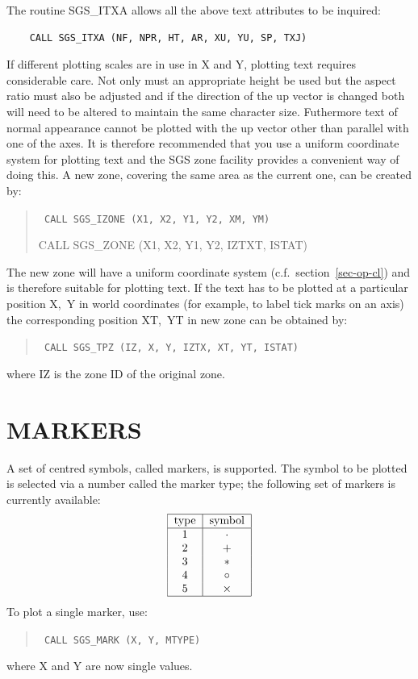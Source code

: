 \documentclass[11pt]{article}
\newcommand{\hyperref}[4]{#2\ref{#4}#3}
\newcommand{\htmlref}[2]{#1}
\begin{document}
The routine 
\htmlref{SGS\_ITXA}{SGS_ITXA}
allows all the above text attributes to be inquired:
\begin{verbatim}
    CALL SGS_ITXA (NF, NPR, HT, AR, XU, YU, SP, TXJ)
\end{verbatim}
If different plotting scales are in use in X and Y, plotting text requires
considerable care.  Not only must an appropriate height be used but the aspect
ratio must also be adjusted and if the direction of the up vector is changed
both will need to be altered to maintain the same character size.  Futhermore
text of normal appearance cannot be plotted with the up vector other than 
parallel with one of the axes.
It is therefore recommended that you use a uniform coordinate system for
plotting text and the SGS zone facility provides a convenient way of doing 
this.  A new zone, covering the same area as the current 
one, can be created by:
\begin{quote}{\tt
    CALL \htmlref{SGS\_IZONE}{SGS_IZONE} (X1, X2, Y1, Y2, XM, YM)

    CALL \htmlref{SGS\_ZONE}{SGS_ZONE} (X1, X2, Y1, Y2, IZTXT, ISTAT)}
\end{quote}
The new zone will have a uniform coordinate system (c.f.\ 
\hyperref{this section}{section~}{}{sec-op-cl}) and is 
therefore suitable for plotting text.  If the text has to be plotted at a
particular position X,~Y in world coordinates (for example, to label tick
marks on an axis) the corresponding position XT,~YT in new zone can be obtained
by:
\begin{quote}{\tt
    CALL \htmlref{SGS\_TPZ}{SGS_TPZ} (IZ, X, Y, IZTX, XT, YT, ISTAT)}
\end{quote}
where IZ is the zone ID of the original zone.

\section {MARKERS}\label{sec-markers}

A set of centred symbols, called markers, is supported.  The
symbol to be plotted is selected via a number called the marker
type;  the following set of markers is currently available:
\[\tt\begin{tabular}{|c|c|}\hline
type&symbol\\\hline
1&$\cdot$\\
2&$+$\\
3&$\ast$\\
4&$\circ$\\
5&$\times$\\\hline
\end{tabular}\]
To plot a single marker,
use:
\begin{quote}{\tt
    CALL \htmlref{SGS\_MARK}{SGS_MARK} (X, Y, MTYPE)}
\end{quote}
where X and Y are now single values.
\end{document}
